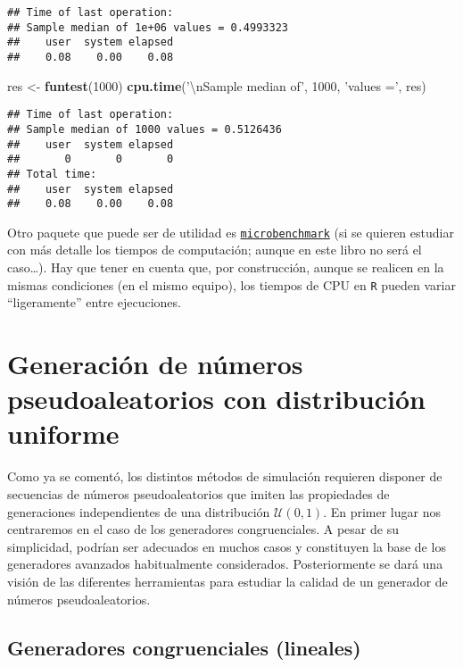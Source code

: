 \documentclass[
]{book}
\newenvironment{Shaded}{\begin{snugshade}}{\end{snugshade}}
\newcommand{\CharTok}[1]{\textcolor[rgb]{0.31,0.60,0.02}{#1}}
\newcommand{\DecValTok}[1]{\textcolor[rgb]{0.00,0.00,0.81}{#1}}
\newcommand{\KeywordTok}[1]{\textcolor[rgb]{0.13,0.29,0.53}{\textbf{#1}}}
\newcommand{\NormalTok}[1]{#1}
\newcommand{\StringTok}[1]{\textcolor[rgb]{0.31,0.60,0.02}{#1}}
\theoremstyle{break}
\theoremstyle{definition}
\theoremstyle{definition}
\theoremstyle{definition}
\theoremstyle{remark}
\begin{document}
\begin{verbatim}
## Time of last operation: 
## Sample median of 1e+06 values = 0.4993323 
##    user  system elapsed 
##    0.08    0.00    0.08
\end{verbatim}

\begin{Shaded}
\begin{Highlighting}[]
\NormalTok{res <-}\StringTok{ }\KeywordTok{funtest}\NormalTok{(}\DecValTok{1000}\NormalTok{)}
\KeywordTok{cpu.time}\NormalTok{(}\StringTok{'}\CharTok{\textbackslash{}n}\StringTok{Sample median of'}\NormalTok{, }\DecValTok{1000}\NormalTok{, }\StringTok{'values ='}\NormalTok{, res)}
\end{Highlighting}
\end{Shaded}

\begin{verbatim}
## Time of last operation: 
## Sample median of 1000 values = 0.5126436 
##    user  system elapsed 
##       0       0       0 
## Total time:
##    user  system elapsed 
##    0.08    0.00    0.08
\end{verbatim}

Otro paquete que puede ser de utilidad es
\href{https://CRAN.R-project.org/package=microbenchmark}{\texttt{microbenchmark}}
(si se quieren estudiar con más detalle los tiempos de computación;
aunque en este libro no será el caso\ldots).
Hay que tener en cuenta que, por construcción, aunque se realicen en la mismas
condiciones (en el mismo equipo), los tiempos de CPU en \texttt{R} pueden variar
``ligeramente'' entre ejecuciones.

\hypertarget{cap3}{%
\chapter{Generación de números pseudoaleatorios con distribución uniforme}\label{cap3}}

Como ya se comentó, los distintos métodos de simulación requieren disponer de secuencias de números pseudoaleatorios que imiten las propiedades de generaciones independientes de una distribución \(\mathcal{U}(0,1)\).
En primer lugar nos centraremos en el caso de los generadores congruenciales. A pesar de su simplicidad, podrían ser adecuados en muchos casos y constituyen la base de los generadores avanzados habitualmente considerados.
Posteriormente se dará una visión de las diferentes herramientas para estudiar la calidad de un generador de números pseudoaleatorios.

\hypertarget{gen-cong}{%
\section{Generadores congruenciales (lineales)}\label{gen-cong}}
\end{document}
